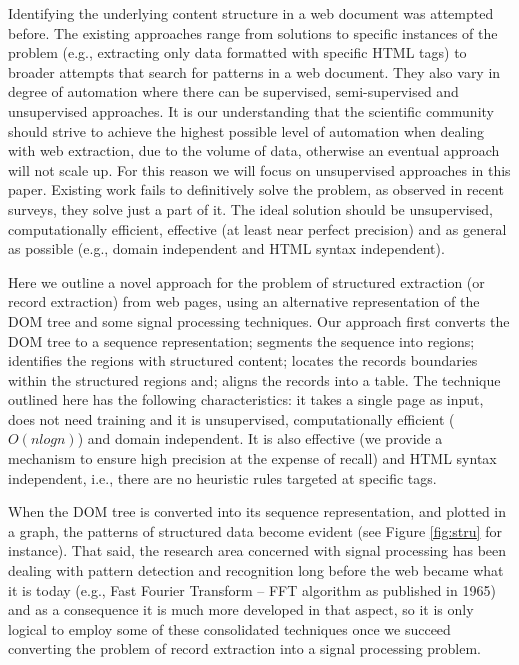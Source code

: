 \documentclass{vldb}
\begin{document}
Identifying the underlying content structure in a web document was attempted
before. The existing approaches range from solutions to specific instances of
the problem (e.g., extracting only data formatted with specific HTML
tags\cite{webtables2008,listExtract2009,qiu2015dexter}) to broader attempts that
search for patterns in a web
document\cite{MDR03,NET05,depta05,TPC09,grigalis2013towards}.
They also vary in degree of automation where there can be supervised,
semi-supervised and unsupervised approaches. It is our understanding that the
scientific community should strive to achieve the highest possible level of
automation when dealing with web extraction, due to the volume of data,
otherwise an eventual approach will not scale up. For this reason we will focus
on unsupervised approaches in this paper.
Existing work fails to definitively solve the problem, as observed in recent
surveys\cite{survey2013,survey2014}, they solve just a part of it. The ideal
solution should be unsupervised, computationally efficient, effective (at
least near perfect precision) and as general as possible (e.g., domain
independent and HTML syntax independent).

Here we outline a novel approach for the problem of structured extraction (or
record extraction) from web pages, using an alternative representation of the
DOM tree and some signal processing techniques. Our approach first converts the
DOM tree to a sequence representation; segments the sequence into regions;
identifies the regions with structured content; locates the records boundaries
within the structured regions and; aligns the records into a table. The
technique outlined here has the following characteristics: it takes a single
page as input, does not need training and it is unsupervised, computationally
efficient ($O(nlogn)$) and domain independent. It is also effective (we provide
a mechanism to ensure high precision at the expense of recall) and HTML syntax
independent, i.e., there are no heuristic rules targeted at specific tags.

When the DOM tree is converted into its sequence representation, and plotted in
a graph, the patterns of structured data become evident (see Figure
\ref{fig:stru} for instance). That said, the research area concerned with signal
processing has been dealing with pattern detection and recognition long before
the web became what it is today (e.g., Fast Fourier Transform --
FFT\cite{fft1965} algorithm as published in 1965) and as a consequence it is
much more developed in that aspect, so it is only logical to employ some of
these consolidated techniques once we succeed converting the problem of
record extraction into a signal processing problem.
\end{document}
